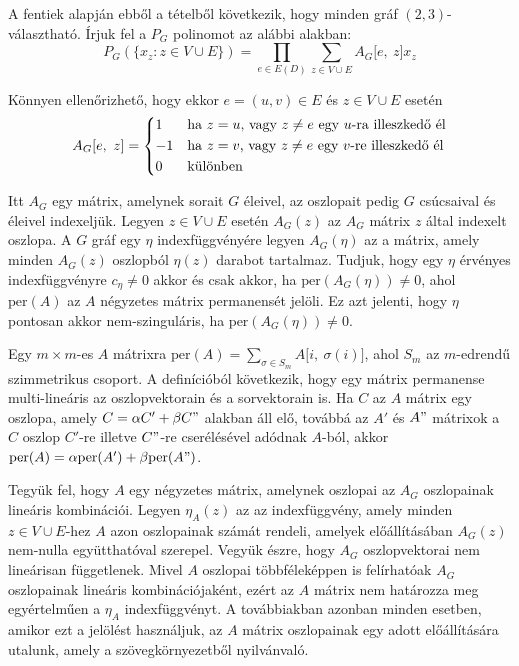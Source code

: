 \documentclass[12pt, a4paper]{report}
\theoremstyle{remark}
\theoremstyle{definition}
\begin{document}
A fentiek alapján ebből a tételből következik, hogy minden gráf $(2, 3)$-választható. Írjuk fel a $P_G$ polinomot az alábbi alakban:
\begin{equation}
P_G(\lbrace x_z: z \in V \cup E \rbrace) = \prod_{e \in E(D)} \sum_{z \in V \cup E} A_G \lbrack e,\ z \rbrack x_z
\end{equation}

Könnyen ellenőrizhető, hogy ekkor $e = (u, v) \in E$ és $z \in V \cup E$ esetén
\begin{equation}
A_G \lbrack e,\ z \rbrack = 
    \begin{dcases*}
    1 & ha $z = u$, vagy $z \neq e$ egy $u$-ra illeszkedő él\\
    -1 & ha $z = v$, vagy $z \neq e$ egy $v$-re illeszkedő él\\
    0 & különben
    \end{dcases*}
\end{equation}

Itt $A_G$ egy mátrix, amelynek sorait $G$ éleivel, az oszlopait pedig $G$ csúcsaival és éleivel indexeljük. Legyen $z \in V \cup E$ esetén $A_G(z)$ az $A_G$ mátrix $z$ által indexelt oszlopa. A $G$ gráf egy $\eta$ indexfüggvényére legyen $A_G(\eta)$ az a mátrix, amely minden $A_G(z)$ oszlopból $\eta(z)$ darabot tartalmaz. Tudjuk, hogy egy $\eta$ érvényes indexfüggvényre $c_{\eta} \neq 0$ akkor és csak akkor, ha $\mathrm{per}(A_G(\eta)) \neq 0$, ahol $\mathrm{per}(A)$ az $A$ négyzetes mátrix permanensét jelöli. Ez azt jelenti, hogy $\eta$ pontosan akkor nem-szinguláris, ha $\mathrm{per}(A_G(\eta)) \neq 0$.

Egy $m \times m$-es $A$ mátrixra $\mathrm{per}(A) = \sum\limits_{\sigma \in S_m} A \lbrack i,\ \sigma(i) \rbrack$, ahol $S_m$ az $m$-edrendű szimmetrikus csoport. A definícióból következik, hogy egy mátrix permanense multi-lineáris az oszlopvektorain és a sorvektorain is. Ha $C$ az $A$ mátrix egy oszlopa, amely $C = \alpha C' + \beta C"$ alakban áll elő, továbbá az $A'$ és $A"$ mátrixok a $C$ oszlop $C'$-re illetve $C"$-re cserélésével adódnak $A$-ból, akkor $\mathrm{per}(A) = \alpha \mathrm{per}(A') + \beta \mathrm{per}(A")$.

Tegyük fel, hogy $A$ egy négyzetes mátrix, amelynek oszlopai az $A_G$ oszlopainak lineáris kombinációi. Legyen $\eta_A(z)$ az az indexfüggvény, amely minden $z \in V \cup E$-hez $A$ azon oszlopainak számát rendeli, amelyek előállításában $A_G(z)$ nem-nulla együtthatóval szerepel. Vegyük észre, hogy $A_G$ oszlopvektorai nem lineárisan függetlenek. Mivel $A$ oszlopai többféleképpen is felírhatóak $A_G$ oszlopainak lineáris kombinációjaként, ezért az $A$ mátrix nem határozza meg egyértelműen a $\eta_A$ indexfüggvényt. A továbbiakban azonban minden esetben, amikor ezt a jelölést használjuk, az $A$ mátrix oszlopainak egy adott előállítására utalunk, amely a szövegkörnyezetből nyilvánvaló.
\end{document}
